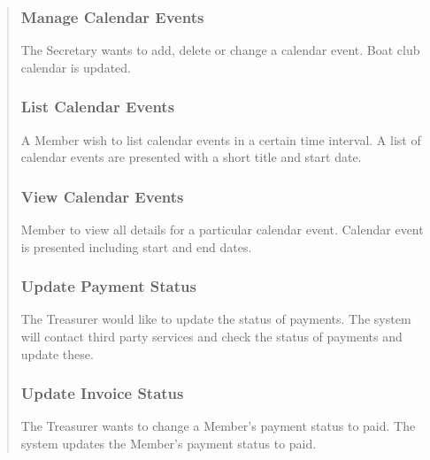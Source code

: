 \begin{quote}
\subsubsection{Manage Calendar Events}\label{usecase10}

The Secretary wants to add, delete or change a calendar event. Boat club
calendar is updated.


\subsubsection{List Calendar Events}\label{usecase11}

A Member wish to list calendar events in a certain time interval. A list
of calendar events are presented with a short title and start date.


\subsubsection{View Calendar Events}\label{usecase12}

Member to view all details for a particular calendar event. Calendar
event is presented including start and end dates.


\subsubsection{Update Payment Status}\label{usecase13}

The Treasurer would like to update the status of payments. The system
will contact third party services and check the status of payments and
update these.


\subsubsection{Update Invoice Status}\label{usecase14}

The Treasurer wants to change a Member's payment status to paid. The
system updates the Member's payment status to paid.

\end{quote}


